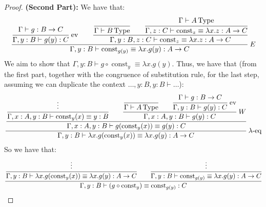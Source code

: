 \begin{dem}
\begin{proof}{\textbf{(Second Part):}}
    We have that:
    \begin{equation*}
        \cfrac{\cfrac{\Gamma\vdash g:B\to C}{\Gamma, y:B\vdash g(y):C}\text{ ev}\qquad \cfrac{\cfrac{}{\Gamma\vdash B\operatorname{Type}}\qquad\cfrac{\Gamma\vdash A\operatorname{Type}}{\Gamma, z:C\vdash\operatorname{const}_z\equiv\lambda x.z:A\to C}}{\Gamma, y:B, z:C\vdash\operatorname{const}_z\equiv\lambda x.z:A\to C}}{\Gamma, y:B\vdash\operatorname{const}_{g(y)}\equiv\lambda x.g(y):A\to C} \ E
    \end{equation*}
    We aim to show that $\Gamma, y:B \vdash g\circ\operatorname{const}_y\equiv\lambda x.g(y)$. Thus, we have that (from the first part, together with the congruence of substitution rule, for the last step, assuming we can duplicate the context $\dots,y:B,y:B\vdash\dots$):
    \begin{equation*}
        \cfrac{\cfrac{\cfrac{\vdots}{\Gamma, x:A,y:B\vdash\operatorname{const}_y(x)\equiv y:B}\qquad\cfrac{\cfrac{}{\Gamma\vdash A\type}\qquad \cfrac{\Gamma\vdash g:B\to C}{\Gamma, y:B\vdash g(y):C}\text{ ev}}{\Gamma, x:A, y:B\vdash g(y):C}\ W}{\Gamma, x:A, y:B\vdash g(\operatorname{const}_y(x))\equiv g(y):C}}{\Gamma, y:B\vdash\lambda x.g(\operatorname{const}_y(x))\equiv\lambda x.g(y):A\to C}\ \lambda\text{-eq}
    \end{equation*}
    So we have that:
    \begin{equation*}
        \cfrac{\cfrac{\vdots}{\Gamma, y:B\vdash\lambda x.g(\operatorname{const}_y(x))\equiv\lambda x.g(y):A\to C}\qquad\cfrac{\vdots}{\Gamma, y:B\vdash\operatorname{const}_{g(y)}\equiv\lambda x.g(y):A\to C}}{\Gamma, y:B\vdash (g\circ\operatorname{const}_y)\equiv \operatorname{const}_{g(y)}:C}
    \end{equation*}
\end{proof}
\end{dem}


